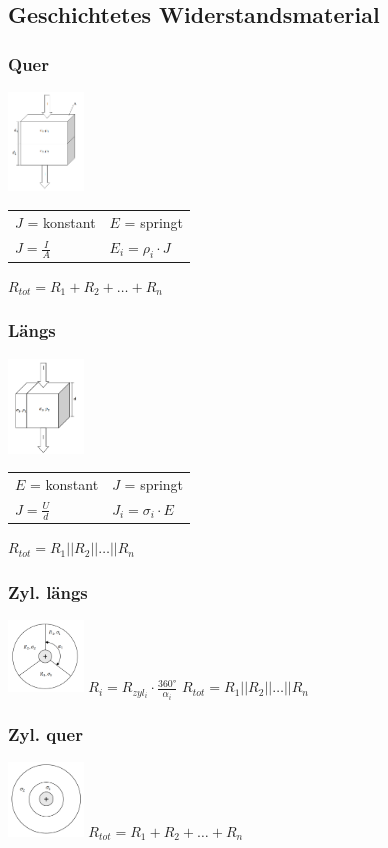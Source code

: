 \subsection{Geschichtetes Widerstandsmaterial}
\begin{multicols}{4}
\subsubsection{Quer}
\includegraphics[width=0.15\textwidth]{pics/stroemungsfeld/Wid_quer}
\begin{tabular}{ll}
$J$ = konstant&$E$ = springt \\
$J = \frac{I}{A}$ & $E_i = \rho_i \cdot J$
\end{tabular}
{\centering$R_{tot} = R_1+R_2+\dots+R_n$\\}
\subsubsection{Längs}
\includegraphics[width=0.15\textwidth]{pics/stroemungsfeld/Wid_laengs}
\begin{tabular}{ll}
$E$ = konstant&$J$ = springt \\
$J = \frac{U}{d}$ & $J_i = \sigma_i \cdot E$
\end{tabular}
{\centering$R_{tot} = R_1||R_2||\dots||R_n$\\}
\subsubsection{Zyl. längs}
\includegraphics[width=0.15\textwidth]{pics/stroemungsfeld/zyl_koax_laengs}
$R_i = R_{zyl_i}\cdot \frac{360°}{\alpha_i}$
$R_{tot} = R_1||R_2||\dots||R_n$
\newline
\subsubsection{Zyl. quer}
\includegraphics[width=0.15\textwidth]{pics/stroemungsfeld/zyl_koax_quer}
$R_{tot} = R_1+R_2+\dots+R_n$\\
\end{multicols}